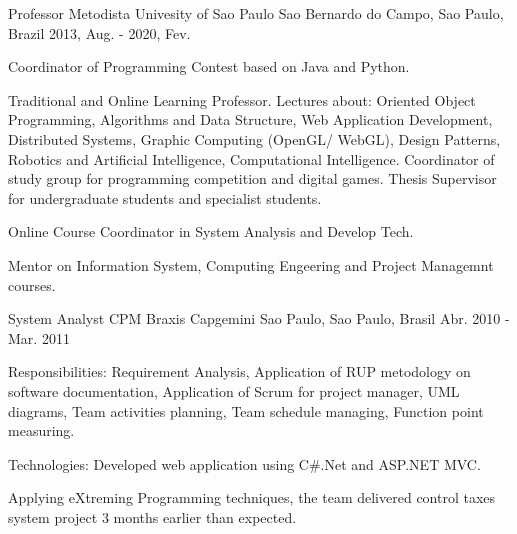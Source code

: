 \begin{cventries}
  \cventry
    {Professor} %
    {Metodista Univesity of Sao Paulo} %
    {Sao Bernardo do Campo, Sao Paulo, Brazil} %
    {2013, Aug. - 2020, Fev.} %
    {
      \begin{cvitems} %
        \item {Coordinator of Programming Contest based on Java and Python.}
        \item {Traditional and Online Learning Professor. Lectures about: Oriented Object Programming, Algorithms and Data Structure, Web Application Development, Distributed Systems, Graphic Computing (OpenGL/ WebGL), Design Patterns, Robotics and Artificial Intelligence, Computational Intelligence. Coordinator of study group for programming competition and digital games. Thesis Supervisor for undergraduate students and specialist students.}
        \item {Online Course Coordinator in System Analysis and Develop Tech.}
        \item {Mentor on Information System, Computing Engeering and Project Managemnt courses.}
      \end{cvitems}
    }

  \cventry
    {System Analyst} %
    {CPM Braxis Capgemini} %
    {Sao Paulo, Sao Paulo, Brasil} %
    {Abr. 2010 - Mar. 2011} %
    {
      \begin{cvitems} %
        \item {Responsibilities: Requirement Analysis, Application of RUP metodology on software documentation, Application of Scrum for project manager, UML diagrams, Team activities planning, Team schedule managing, Function point measuring.}
        \item {Technologies: Developed web application using C\#.Net and ASP.NET MVC.}
        \item {Applying eXtreming Programming techniques, the team delivered control taxes system project 3 months earlier than expected.}
      \end{cvitems}
    }


\end{cventries}
